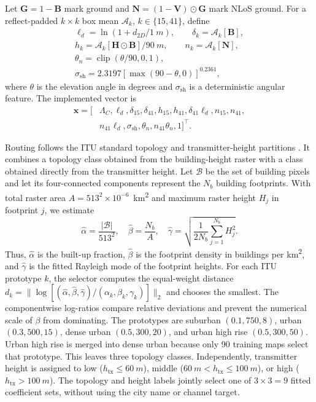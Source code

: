 \documentclass[10pt,conference,letterpaper]{IEEEtran}
\begin{document}
Let $\mathbf G=1-\mathbf B$ mark ground and
$\mathbf N=(1-\mathbf V)\odot\mathbf G$ mark NLoS ground. For a
reflect-padded $k\times k$ box mean $\mathcal A_k$, $k\in\{15,41\}$, define
\begin{equation}
\begin{gathered}
\ell_d=\ln(1+d_{2D}/\SI{1}{m}),\qquad
\delta_k=\mathcal A_k[\mathbf B],\\
h_k=\mathcal A_k[\mathbf H\odot\mathbf B]/\SI{90}{m},\qquad
n_k=\mathcal A_k[\mathbf N],\\
\theta_n=\operatorname{clip}(\theta/90,0,1),\\
\sigma_{\mathrm{sh}}=2.3197[\max(90-\theta,0)]^{0.2361},
\end{gathered}
\label{eq:features}
\end{equation}
where $\theta$ is the elevation angle in degrees and
$\sigma_{\mathrm{sh}}$ is a deterministic angular feature. The implemented vector is
\begin{equation}
\begin{aligned}
\mathbf x=[&\Lambda_C,\ell_d,\delta_{15},\delta_{41},h_{15},h_{41},
\delta_{41}\ell_d,n_{15},n_{41},\\
&n_{41}\ell_d,\sigma_{\mathrm{sh}},\theta_n,n_{41}\theta_n,1]^\top .
\end{aligned}
\label{eq:nlos-vector}
\end{equation}

Routing follows the ITU standard topology and transmitter-height partitions
\cite{iturp1410,saboor2024geometry}. It combines a topology class obtained from
the building-height raster with a class obtained directly from the transmitter
height. Let $\mathcal B$ be the set of building pixels and let its
four-connected components represent the $N_b$ building footprints. With total raster area
$A=513^2\times10^{-6}$~\si{km^2} and maximum raster height $H_j$ in footprint
$j$, we estimate
\begin{equation}
\hat\alpha=\frac{|\mathcal B|}{513^2},\quad
\hat\beta=\frac{N_b}{A},\quad
\hat\gamma=\sqrt{\frac{1}{2N_b}\sum_{j=1}^{N_b}H_j^2}.
\label{eq:itu-routing}
\end{equation}
Thus, $\hat\alpha$ is the built-up fraction, $\hat\beta$ is the footprint
density in buildings per \si{km^2}, and $\hat\gamma$ is the fitted Rayleigh
mode of the footprint heights. For each ITU prototype $k$, the
selector computes the equal-weight distance
$d_k=\|\log[(\hat\alpha,\hat\beta,\hat\gamma)/
(\alpha_k,\beta_k,\gamma_k)]\|_2$ and chooses the smallest. The componentwise
log-ratios compare relative deviations and prevent the numerical scale of
$\beta$ from dominating. The prototypes are suburban $(0.1,750,8)$, urban
$(0.3,500,15)$, dense urban $(0.5,300,20)$, and urban high rise
$(0.5,300,50)$. Urban high rise is merged
into dense urban because only 90 training maps select that prototype. This
leaves three topology classes. Independently, transmitter height is assigned
to low ($h_{\mathrm{tx}}\le\SI{60}{m}$), middle
($\SI{60}{m}<h_{\mathrm{tx}}\le\SI{100}{m}$), or high
($h_{\mathrm{tx}}>\SI{100}{m}$). The topology and height labels jointly select
one of $3\times3=9$ fitted coefficient sets, without using the city name or
channel target.
\end{document}
